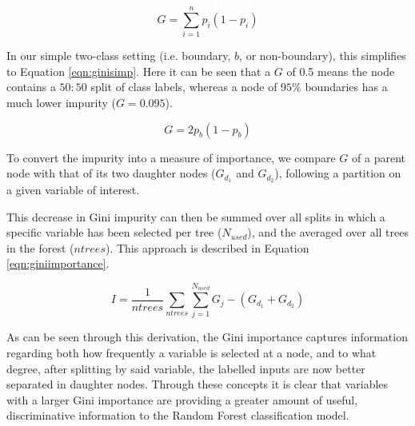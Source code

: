 \documentclass[a4paper,11pt,oneside]{book}
\begin{document}
\begin{equation}\label{eqn:gini}
G = \sum_{i=1}^{n} p_i(1-p_i)
\end{equation}

In our simple two-class setting (i.e. boundary, $b$, or non-boundary), this simplifies to Equation \ref{eqn:ginisimp}. Here it can be seen that a $G$ of 0.5 means the node contains a $50:50$ split of class labels, whereas a node of $95\%$ boundaries has a much lower impurity ($G = 0.095$).

\begin{equation}\label{eqn:ginisimp}
G =  2p_{b} (1-p_{b})
\end{equation}

To convert the impurity into a measure of importance, we compare $G$ of a parent node with that of its two daughter nodes ($G_{d_1}$ and $G_{d_2}$), following a partition on a given variable of interest. %

This decrease in Gini impurity can then be summed over all splits in which a specific variable has been selected per tree ($N_{used}$), and the averaged over all trees in the forest ($ntrees$). This approach is described in Equation \ref{eqn:giniimportance}.


\begin{equation}\label{eqn:giniimportance}
I = \frac{1}{ntrees} \sum_{ntrees} \sum_{j=1}^{N_{used}} G_{j} - (G_{d_1} + G_{d_2})
\end{equation}

As can be seen through this derivation, the Gini importance captures information regarding both how frequently a variable is selected at a node, and to what degree, after splitting by said variable, the labelled inputs are now better separated in daughter nodes. Through these concepts it is clear that variables with a larger Gini importance are providing a greater amount of useful, discriminative information to the Random Forest classification model.
\end{document}
